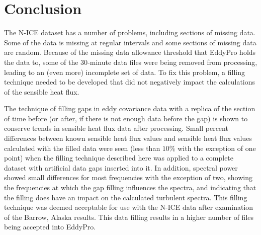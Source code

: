  \section{Conclusion}
The N-ICE dataset has a number of problems, including sections of missing data. Some of the data is missing at regular intervals and some sections of missing data are random. Because of the missing data allowance threshold that EddyPro holds the data to, some of the 30-minute data files were being removed from processing, leading to an (even more) incomplete set of data. To fix this problem, a filling technique needed to be developed that did not negatively impact the calculations of the sensible heat flux.

The technique of filling gaps in eddy covariance data with a replica of the section of time before (or after, if there is not enough data before the gap) is shown to conserve trends in sensible heat flux data after processing. Small percent differences between known sensible heat flux values and sensible heat flux values calculated with the filled data were seen (less than $10\%$ with the exception of one point) when the filling technique described here was applied to a complete dataset with artificial data gaps inserted into it. In addition, spectral power showed small differences for most frequencies with the exception of two, showing the frequencies at which the gap filling influences the spectra, and indicating that the filling does have an impact on the calculated turbulent spectra. This filling technique was deemed acceptable for use with the N-ICE data after examination of the Barrow, Alaska results. This data filling results in a higher number of files being accepted into EddyPro.

